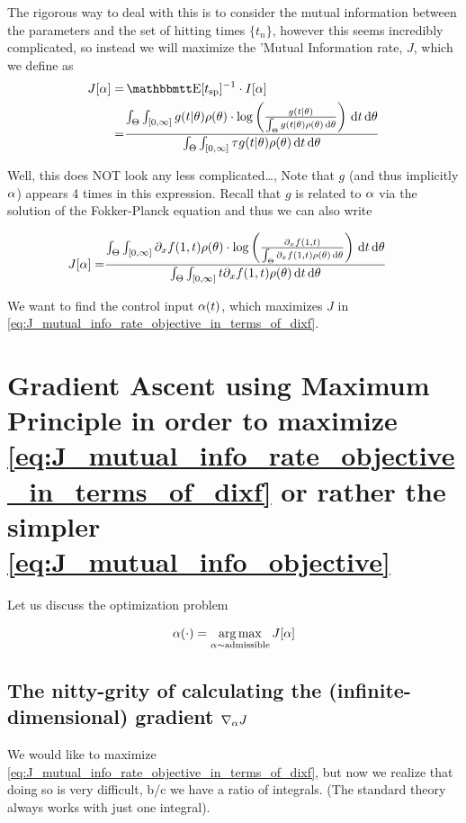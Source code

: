 \documentclass{article}
\begin{document}
The rigorous way to deal with this is to consider the mutual information between
the parameters and the set of hitting times $\{t_n\}$, however this seems
incredibly complicated, so instead we will maximize the 'Mutual Information
rate, $J$, which we define as 
\begin{align}
J[\a]= & \Exp[\ts]^{-1} \cdot I[\a]
\\
= & \frac{
\int_\Theta \int_{[0, \infty]} g(t|\th)  \rho(\th) \cdot 
\log \left( \frac{g(t|\th)}{\int_\Theta g(t|\th)\rho(\th) \intd{\th} } \right)
\intd{t}\intd{\th}}
{ \int_\Theta \int_{[0, \infty]} \t g(t|\th)\rho(\th) \intd{t}\intd{\th}}
\label{eq:J_mutual_info_rate_objective}
\end{align}

Well, this does NOT look any less complicated\ldots, Note that $g$ (and thus
implicitly ${\alpha}$) appears 4 times in this expression. Recall that $g$ is related
to ${\alpha}$ via the solution of the Fokker-Planck equation and thus we can also
write

\begin{align}
J[{\alpha}] 
= & \frac{
\int_\Theta \int_{[0, \infty]} {\partial}_xf(1, t)  \rho({\theta}) \cdot 
\log \left( \frac{{\partial}_xf(1, t)}{\int_\Theta {\partial}_xf(1, t)\rho({\theta}) \, \mathrm{d} {\theta} } \right)
\, \mathrm{d} t\, \mathrm{d} {\theta}}
{ \int_\Theta \int_{[0, \infty]} t {\partial}_xf(1, t)\rho({\theta}) \, \mathrm{d} t\, \mathrm{d} {\theta}}
\label{eq:J_mutual_info_rate_objective_in_terms_of_dixf} 
\end{align}
  
We want to find the control input ${\alpha}(t)$, which maximizes $J$ in
\cref{eq:J_mutual_info_rate_objective_in_terms_of_dixf}. 

\section{Gradient Ascent using Maximum Principle in order to maximize 
\cref{eq:J_mutual_info_rate_objective_in_terms_of_dixf} or rather the simpler 
\cref{eq:J_mutual_info_objective}} 

Let us discuss the optimization problem

$$
\a(\cdot) = \argmax_{\a \sim \textrm{admissible}} J[\a]
$$ 
   

\subsection{The nitty-grity of calculating the (infinite-dimensional) gradient
${ \nabla }_{{\alpha}} J$ } We would like to maximize
\cref{eq:J_mutual_info_rate_objective_in_terms_of_dixf}, but now we realize that
doing so is very difficult, b/c we have a ratio of integrals. (The standard
theory always works with just one integral).
\end{document}
